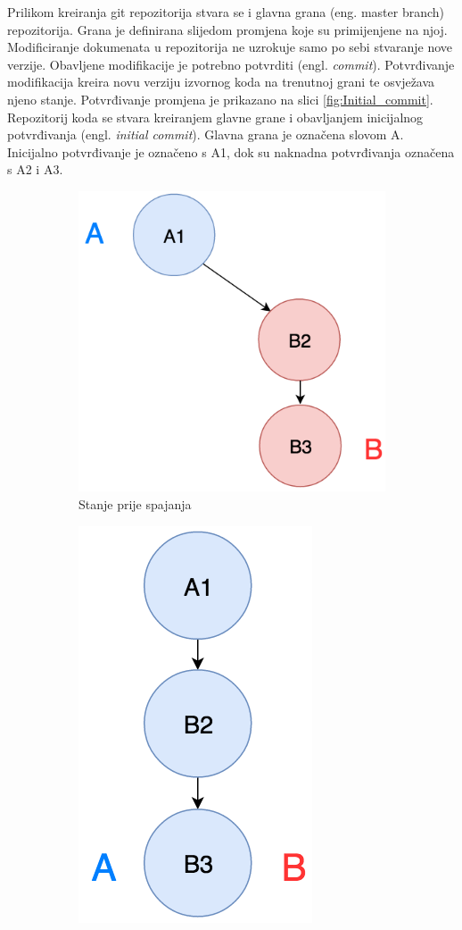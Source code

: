 \documentclass[times, utf8, diplomski, numeric]{fer}
\newcommand{\eng}[1]{(engl. \textit{#1})}
\begin{document}
Prilikom kreiranja git repozitorija stvara se i glavna grana (eng. master branch) repozitorija. Grana je definirana slijedom promjena koje su primijenjene na njoj. Modificiranje dokumenata u repozitorija ne uzrokuje samo po sebi stvaranje nove verzije. Obavljene modifikacije je potrebno potvrditi \eng{commit}. Potvrđivanje modifikacija kreira novu verziju izvornog koda na trenutnoj grani te osvježava njeno stanje. Potvrđivanje promjena je prikazano na slici \ref{fig:Initial_commit}. Repozitorij koda se stvara kreiranjem glavne grane i obavljanjem inicijalnog potvrđivanja \eng{initial commit}. Glavna grana je označena slovom A. Inicijalno potvrđivanje je označeno s A1, dok su naknadna potvrđivanja označena s A2 i A3.

\begin{figure}
\centering
\begin{subfigure}{.49\textwidth}
\centering
\includegraphics[scale=0.6]{FastForwardA}
\caption{Stanje prije spajanja}
\label{fig:FastForwardA}
\end{subfigure}
\begin{subfigure}{.49\textwidth}
\centering
\includegraphics[scale=0.6]{FastForwardB}

\end{subfigure}
\end{figure}
\end{document}
